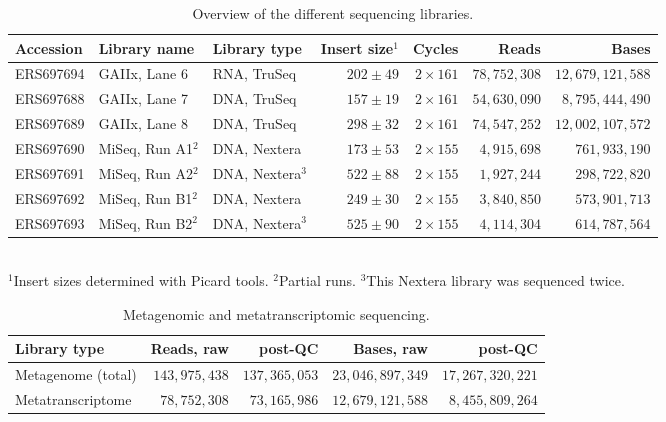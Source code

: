 \documentclass{bmcart}
\begin{document}
\begin{backmatter}
\begin{table}[h!]
\caption{Overview of the different sequencing libraries.}
\begin{tabular}{lllrrrr}
\hline
Accession & Library name & Library type & Insert size$^{1}$ & Cycles & Reads & Bases \\
\hline
ERS697694 & GAIIx, Lane 6 & RNA, TruSeq & $202 \pm 49$ & $2 \times 161$ & $78,752,308$ & $12,679,121,588$ \\
ERS697688 & GAIIx, Lane 7 & DNA, TruSeq & $157 \pm 19$ & $2 \times 161$ & $54,630,090$ & $8,795,444,490$ \\
ERS697689 & GAIIx, Lane 8 & DNA, TruSeq & $298 \pm 32$ & $2 \times 161$ & $74,547,252$ & $12,002,107,572$ \\
ERS697690 & MiSeq, Run A1$^{2}$ & DNA, Nextera & $173 \pm 53$ & $2 \times 155$ & $4,915,698$ & $761,933,190$ \\
ERS697691 & MiSeq, Run A2$^{2}$ & DNA, Nextera$^{3}$ & $522 \pm 88$ & $2 \times 155$ & $1,927,244$ & $298,722,820$ \\
ERS697692 & MiSeq, Run B1$^{2}$ & DNA, Nextera & $249 \pm 30$ & $2 \times 155$ & $3,840,850$ & $573,901,713$ \\
ERS697693 & MiSeq, Run B2$^{2}$ & DNA, Nextera$^{3}$ & $525 \pm 90$ & $2 \times 155$ & $4,114,304$ & $614,787,564$ \\
\hline
\end{tabular}
\\{$^{1}$Insert sizes determined with Picard tools. $^{2}$Partial runs. $^{3}$This Nextera library was sequenced twice.}
\label{tReads}
\end{table}

\begin{table}[h!]
\caption{Metagenomic and metatranscriptomic sequencing.}
\begin{tabular}{lrrrr}
\hline
Library type & Reads, raw & post-QC & Bases, raw & post-QC\\
\hline
Metagenome (total) & $143,975,438$ & $137,365,053$ & $23,046,897,349$ & $17,267,320,221$ \\
Metatranscriptome & $78,752,308$ & $73,165,986$ & $12,679,121,588$ & $8,455,809,264$ \\
\hline
\end{tabular}
\label{tPostQC}
\end{table}


\end{backmatter}
\end{document}
